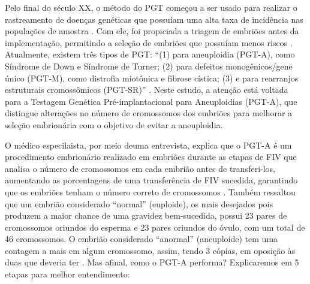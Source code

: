 Pelo final do século XX, o método do PGT começou a ser usado para realizar o rastreamento de doenças genéticas que possuíam uma alta taxa de incidência nas populações de amostra \cite{yang2024}. Com ele, foi propiciada a triagem de embriões antes da implementação, permitindo a seleção de embriões que possuíam menos riscos \cite{scienceofbiogenetics2024}. Atualmente, existem três tipos de PGT: “(1) para aneuploidia (PGT-A), como Síndrome de Down e Síndrome de Turner; (2) para defeitos monogênicos/gene único (PGT-M), como distrofia miotônica e fibrose cística; (3) e para rearranjos estruturais cromossômicos (PGT-SR)” \cite{yang2024}. Neste estudo, a atenção está voltada para a Testagem Genética Pré-implantacional para Aneuploidias (PGT-A), que distingue alterações no número de cromossomos dos embriões para melhorar a seleção embrionária com o objetivo de evitar a aneuploidia.  

O médico especilaista, por meio deuma entrevista, explica que o PGT-A é um procedimento embrionário realizado em embriões durante as etapas de FIV que analisa o número de cromossomos em cada embrião antes de transferi-los, aumentando as porcentagens de uma transferência de FIV sucedida, garantindo que os embriões tenham o número correto de cromossomos \cite{ramalho2024}. Também ressaltou que um embrião considerado “normal” (euploide), os mais desejados pois produzem a maior chance de uma gravidez bem-sucedida, possui 23 pares de cromossomos oriundos do esperma e 23 pares oriundos do óvulo, com um total de 46 cromossomos. O embrião considerado “anormal” (aneuploide) tem uma contagem a mais em algum cromossomo, assim, tendo 3 cópias, em oposição às duas que deveria ter \cite{cnyfertility2024}. Mas afinal, como o PGT-A performa? Explicaremos em 5 etapas para melhor entendimento:

